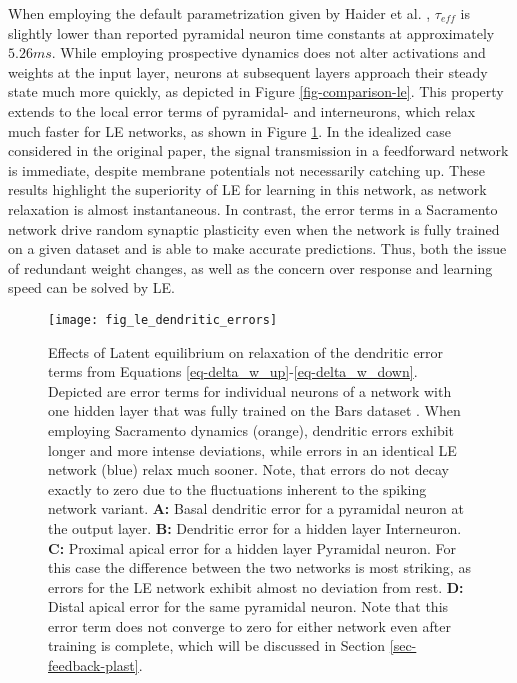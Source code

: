 When employing the default parametrization given by Haider et al. , $\tau_{eff}$ is
slightly lower than reported pyramidal neuron time constants \citep{McCormick1985} at approximately $5.26ms$. While
employing prospective dynamics does not alter activations and weights at the input layer, neurons at subsequent layers
approach their steady state much more quickly, as depicted in Figure \ref{fig-comparison-le}. This property extends to
the local error terms of pyramidal- and interneurons, which relax much faster for LE networks, as shown in Figure
\ref{fig-error-comp-le}. In the idealized case considered in the original paper, the signal transmission in a
feedforward network is immediate, despite membrane potentials not necessarily catching up. These results highlight the
superiority of LE for learning in this network, as network relaxation is almost instantaneous. In contrast, the error
terms in a Sacramento network drive random synaptic plasticity even when the network is fully trained on a given dataset
and is able to make accurate predictions. Thus, both the issue of redundant weight changes, as well as the concern over
response and learning speed can be solved by LE.\newline




\begin{figure}[h]
  \centering
  \texttt{[image: fig\_le\_dendritic\_errors]}
  \caption{Effects of Latent equilibrium on relaxation of the dendritic error terms from Equations
    \ref{eq-delta_w_up}-\ref{eq-delta_w_down}. Depicted are error terms for individual neurons of a network with one
    hidden layer that was fully trained on the Bars dataset . When employing Sacramento dynamics (orange),
    dendritic errors exhibit longer and more intense deviations, while errors in an identical LE network (blue) relax
    much sooner. Note, that errors do not decay exactly to zero due to the fluctuations inherent to the spiking network
    variant. \textbf{A:} Basal dendritic error for a pyramidal neuron at the output layer. \textbf{B:} Dendritic error
    for a hidden layer Interneuron. \textbf{C:} Proximal apical error for a hidden layer Pyramidal neuron. For this case
    the difference between the two networks is most striking, as errors for the LE network exhibit almost no deviation
    from rest. \textbf{D:} Distal apical error for the same pyramidal neuron. Note that this error term does not
    converge to zero for either network even after training is complete, which will be discussed in Section
    \ref{sec-feedback-plast}.}
  \label{fig-error-comp-le}
\end{figure}

